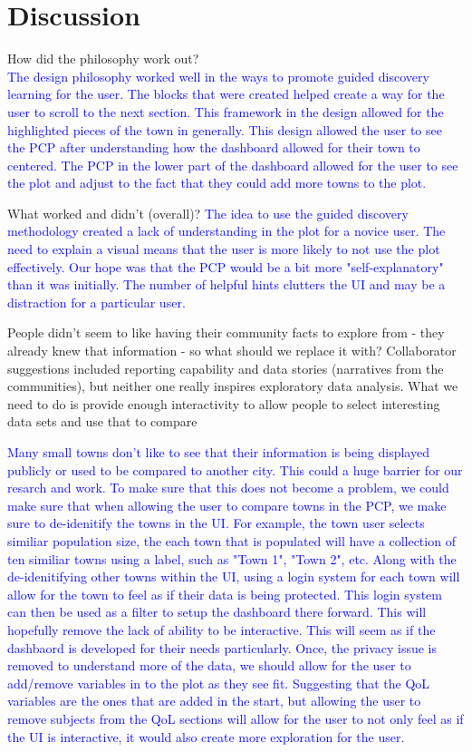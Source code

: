 \documentclass[letterpaper,inpress]{jdsart}
\begin{document}
\section{ Discussion}

How did the philosophy work out?\\
{\textcolor{blue}{The design philosophy worked well in the ways to promote guided discovery learning for the user. The blocks that were created helped create a way for the user to scroll to the next section. This framework in the design allowed for the highlighted pieces of the town in generally. This design allowed the user to see the PCP after understanding how the dashboard allowed for their town to centered. The PCP in the lower part of the dashboard allowed for the user to see the plot and adjust to the fact that they could add more towns to the plot.}}

What worked and didn't (overall)?
{\textcolor{blue}{The idea to use the guided discovery methodology created a lack of understanding in the plot for a novice user. The need to explain a visual means that the user is more likely to not use the plot effectively. Our hope was that the PCP would be a bit more "self-explanatory" than it was initially. The number of helpful hints clutters the UI and may be a distraction for a particular user. }}

People didn't seem to like having their community facts to explore from - they already knew that information - so what should we replace it with? Collaborator suggestions included reporting capability and data stories (narratives from the communities), but neither one really inspires exploratory data analysis. What we need to do is provide enough interactivity to allow people to select interesting data sets and use that to compare

{\textcolor{blue}{Many small towns don't like to see that their information is being displayed publicly or used to be compared to another city. This could a huge barrier for our resarch and work. To make sure that this does not become a problem, we could make sure that when allowing the user to compare towns in the PCP, we make sure to de-idenitify the towns in the UI. For example, the town user selects similiar population size, the each town that is populated will have a collection of ten similiar towns using a label, such as "Town 1", "Town 2", etc. }}
{\textcolor{blue}{Along with the de-idenitifying other towns within the UI, using a login system for each town will allow for the town to feel as if their data is being protected. This login system can then be used as a filter to setup the dashboard there forward. This will hopefully remove the lack of ability to be interactive. This will seem as if the dashbaord is developed for their needs particularly.}}
{\textcolor{blue}{Once, the privacy issue is removed to understand more of the data, we should allow for the user to add/remove variables in to the plot as they see fit. Suggesting that the QoL variables are the ones that are added in the start, but allowing the user to remove subjects from the QoL sections will allow for the user to not only feel as if the UI is interactive, it would also create more exploration for the user.}}
\end{document}
